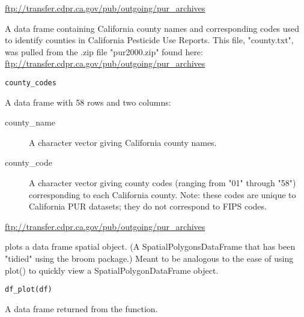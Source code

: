 \documentclass[a4paper]{book}
\begin{document}
%
\begin{Source}\relax
\url{ftp://transfer.cdpr.ca.gov/pub/outgoing/pur_archives}
\end{Source}
%
\begin{Description}\relax
A data frame containing California county names and corresponding codes
used to identify counties in California Pesticide Use Reports. This file,
"county.txt", was pulled from the .zip file "pur2000.zip" found here:
\url{ftp://transfer.cdpr.ca.gov/pub/outgoing/pur_archives}
\end{Description}
%
\begin{Usage}
\begin{verbatim}
county_codes
\end{verbatim}
\end{Usage}
%
\begin{Format}
A data frame with 58 rows and two columns:
\begin{description}

\item[county\_name] A character vector giving California county names.
\item[county\_code] A character vector giving county codes (ranging from "01"
through "58") corresponding to each California county. Note: these codes
are unique to California PUR datasets; they do not correspond to FIPS
codes.

\end{description}
\end{Format}
%
\begin{Source}\relax
\url{ftp://transfer.cdpr.ca.gov/pub/outgoing/pur_archives}
\end{Source}
%
\begin{Description}\relax
{} plots a data frame spatial object. (A
SpatialPolygonsDataFrame that has been "tidied" using the broom package.)
Meant to be analogous to the ease of using plot() to quickly view a
SpatialPolygonDataFrame object.
\end{Description}
%
\begin{Usage}
\begin{verbatim}
df_plot(df)
\end{verbatim}
\end{Usage}
%
\begin{Arguments}
\begin{ldescription}
\item[\code{df}] A data frame returned from the  function.
\end{ldescription}
\end{Arguments}
\end{document}
